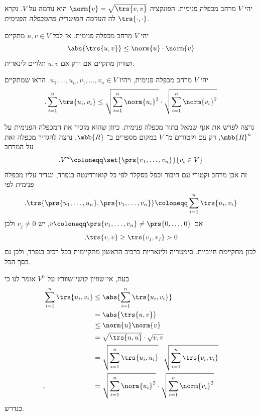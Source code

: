 \documentclass[a4paper,10pt,twoside,openany]{book}
\begin{document}
\begin{theorem}
יהי
$V$
מרחב מכפלה פנימית.
הפונקציה
$\norm{v} = \sqrt{\trs{v,v}}$
היא נורמה על
$V$.
נקרא לה
\emph{הנורמה המושרית מהמכפלה הפנימית
$\trs{\cdot,\cdot}$}.
\end{theorem}

\begin{theorem}
יהי
$V$
מרחב מכפלה פנימית. אז לכל
$u,v \in V$
מתקיים
\[\abs{\trs{u,v}} \leq \norm{u} \cdot \norm{v}\]
ושוויון מתקיים אם ורק אם
$u,v$
תלויים לינארית.
\end{theorem}

\begin{exercisechap}
יהי
$V$
מרחב מכפלה פנימית, ויהיו
$u_1, \ldots, u_n, v_1, \ldots, v_n \in V$.
הראו שמתקיים
\begin{align*}
\text{.} \sum_{i = 1}^n \trs{u_i, v_i} \leq \sqrt{{\sum_{i = 1}^n \norm{u_i}^2}} \cdot \sqrt{\sum_{i=1}^n \norm{v_i}^2}
\end{align*}
\end{exercisechap}

\begin{solution}
נרצה לפרש את אגף שמאל בתור מכפלה פנימית.
כיוון שהוא מזכיר את המכפלה הפנימית על
$\mbb{R}^n$,
רק עם וקטורים מ־%
$V$
במקום מספרים ב־%
$\mbb{R}$,
נרצה להגדיר מכפלה זאת על המרחב
\[\text{.} V^n \coloneqq \set{\prs{v_1, \ldots, v_n}}{v_i \in V}\]
זה אכן מרחב וקטורי עם חיבור וכפל בסקלר לפי כל קואורדינטה בנפרד, ונגדיר עליו מכפלה פנימית לפי
\[\text{.} \trs{\prs{u_1, \ldots, u_n}, \prs{v_1, \ldots, v_n}} \coloneqq \sum_{i = 1}^n \trs{u_i, v_i}\]
אם
$v \coloneqq \prs{v_1, \ldots, v_n} \neq \prs{0, \ldots, 0}$,
יש
$v_j \neq 0$
ולכן
\[\text{,} \trs{v,v} \geq \trs{v_j, v_j} > 0\]
לכון מתקיימת חיוביות.
סימטריה ולינאריות ברכיב הראשון מתקיימות בכל רכיב בנפרד, ולכן גם בסך הכל.

כעת, אי־שוויון קושי־שוורץ על
$V^n$
אומר לנו כי
\begin{align*}
\sum_{i = 1}^n \trs{u_i, v_i}
&\leq
\abs{\sum_{i = 1}^n \trs{u_i, v_i}}
\\&=
\abs{\trs{u,v}}
\\&\leq
\norm{u} \norm{v}
\\&=
\sqrt{\trs{u,u}} \cdot \sqrt{v,v}
\\&=
\sqrt{{\sum_{i = 1}^n \trs{u_i, u_i}}} \cdot \sqrt{\sum_{i=1}^n \trs{v_i, v_i}}
\\\text{,}\hphantom{\sum_{i = 1}^n \trs{u_i, v_i}}&=
\sqrt{{\sum_{i = 1}^n \norm{u_i}^2}} \cdot \sqrt{\sum_{i=1}^n \norm{v_i}^2}
\end{align*}
כנדרש.
\end{solution}
\end{document}

